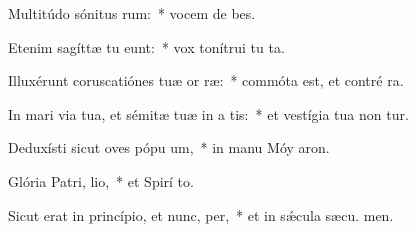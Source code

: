 \item Multitúdo sónitus rum:~* vocem de bes.
\item Etenim sagíttæ tu eunt:~* vox tonítrui tu  ta.
\item Illuxérunt coruscatiónes tuæ or ræ:~* commóta est, et contré ra.
\item In mari via tua, et sémitæ tuæ in a tis:~* et vestígia tua non tur.
\item Deduxísti sicut oves pópu um,~* in manu Móy  aron.
\item Glória Patri,  lio,~* et Spirí to.
\item Sicut erat in princípio, et nunc,  per,~* et in sǽcula sæcu. men.
